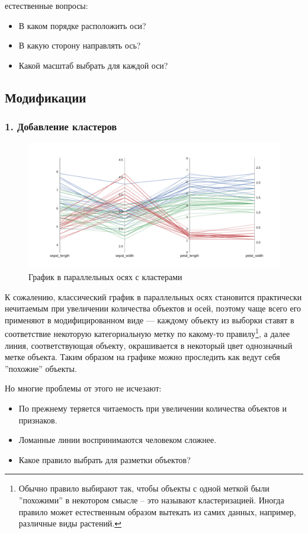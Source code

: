 \documentclass[12pt,fleqn]{article}
\begin{document}
 естественные вопросы:
\begin{itemize}
    \item В каком порядке расположить оси?
    \item В какую сторону направлять ось?
    \item Какой масштаб выбрать для каждой оси?
\end{itemize}

\subsection{Модификации}
\subsubsection{1. Добавление кластеров}

\begin{figure}[htb]
    \centering
    \includegraphics[width=15cm]{color_pc.pdf}
    \caption{График в параллельных осях с кластерами}
    \label{color_pc}
\end{figure}

К сожалению, классический график в параллельных осях становится практически нечитаемым при увеличении 
количества объектов и осей, поэтому чаще всего его применяют в модифицированном виде ---
каждому объекту из выборки ставят в соответствие некоторую категориальную метку по какому-то правилу\footnote{
Обычно правило выбирают так, чтобы объекты с одной меткой были ''похожими'' в некотором смысле --
это называют кластеризацией. Иногда правило может естественным образом вытекать из самих данных,
например, различные виды растений.},
а далее линия, соответствующая объекту, окрашивается в некоторый цвет однозначный метке объекта.
Таким образом на графике можно проследить как ведут себя ''похожие'' объекты.

Но многие проблемы от этого не исчезают:
\begin{itemize}
    \item По прежнему теряется читаемость при увеличении количества объектов и признаков.
    \item Ломанные линии воспринимаются человеком сложнее.
    \item Какое правило выбрать для разметки объектов?
\end{itemize}
\end{document}
